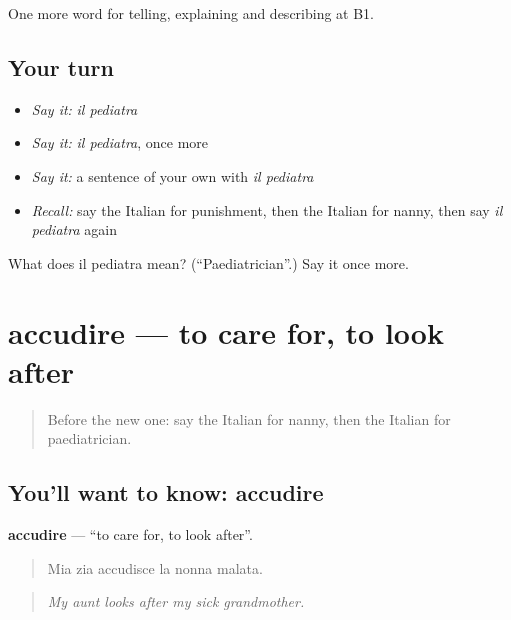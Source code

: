 \begin{grammarlens}[title={What you've built}]
One more word for telling, explaining and describing at B1.
\end{grammarlens}

\subsection*{Your turn}
\begin{itemize}
\raggedright
  \item \emph{Say it:} \emph{il pediatra}
  \item \emph{Say it:} \emph{il pediatra}, once more
  \item \emph{Say it:} a sentence of your own with \emph{il pediatra}
  \item \emph{Recall:} say the Italian for punishment, then the Italian for nanny, then say \emph{il pediatra} again
\end{itemize}

\begin{tcolorbox}[breakable,colback=teal!4,colframe=teal!35!black,title={Before you move on}]
What does il pediatra mean? (\textquotedblleft{}Paediatrician\textquotedblright{}.) Say it once more.
\end{tcolorbox}
\section[accudire]{accudire — to care for, to look after}

\label{lesson:IT-C498-accudire}



\begin{quote}
Before the new one: say the Italian for nanny, then the Italian for paediatrician.
\end{quote}

\subsection*{You'll want to know: accudire}
\textbf{accudire} — \textquotedblleft{}to care for, to look after\textquotedblright{}.

\begin{quote}
Mia zia accudisce la nonna malata.
\end{quote}

\begin{quote}
\emph{My aunt looks after my sick grandmother.}
\end{quote}

